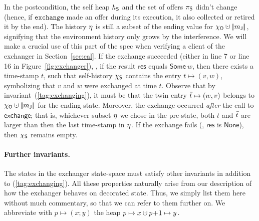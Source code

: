 In the postcondition, the self heap $h_{\mathsf{S}}$ and the set of offers
$\pi_{\mathsf{S}}$ didn't change (hence, if $\mathtt{exchange}$ made an offer
during its execution, it also collected or retired it by the end).
%
The history $\eta$ is still a subset of the ending value for $\histo
\hunion \mygather{\pending}$, signifying that the environment history
only grows by the interference. We will make a crucial use of this
part of the spec when verifying a client of the exchanger in
Section~\ref{sec:cal}.
%
If the exchange succeeded (either in line 7 or line 16 in
Figure~\ref{fig:exchanger}), \ie, if the result $\mathsf{res}$ equals
$\mathsf{Some}\ w$, then there exists a time-stamp $t$, such that
self-history $\chi_{\mathsf{S}}$ contains the entry $t \mapsto (v, w)$,
symbolizing that $v$ and $w$ were exchanged at time $t$.  Observe that
by invariant~(\ref{tag:exchanging}), it must be that the twin entry
$\bar{t} \mapsto (w, v)$ belongs to $\histo \hunion
\mygather{\pending}$ for the ending state.  Moreover, the exchange
occurred \emph{after} the call to $\mathsf{exchange}$; that is,
whichever subset $\eta$ we chose in the pre-state, both $t$ and
$\bar{t}$ are larger than then the last time-stamp in $\eta$. If the
exchange fails (\ie, $\mathsf{res}$ is $\mathsf{None}$), then
$\chi_{\mathsf{S}}$ remains empty.

%
%

\paragraph{Further invariants.}
%
The states in the exchanger state-space must satisfy other invariants
in addition to (\ref{tag:exchanging}). All these properties naturally
arise from our description of how the exchanger behaves on decorated
state. Thus, we simply list them here without much commentary, so that
we can refer to them further on. We abbreviate with $p \mapsto (x; y)$
the heap $p \mapsto x \hunion p\!+\!1 \mapsto y$.

